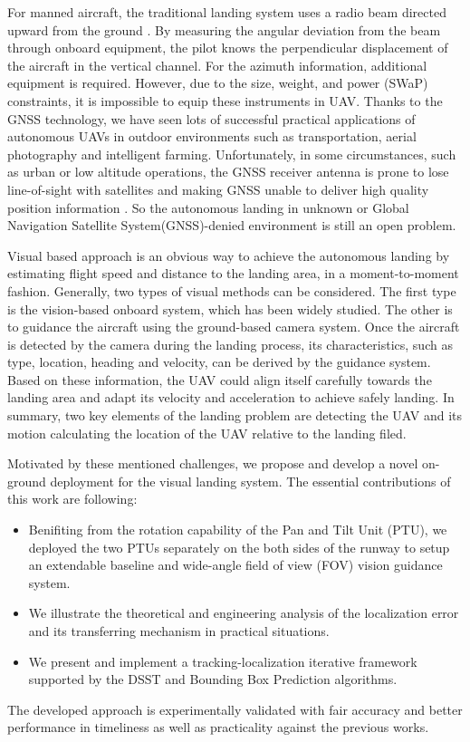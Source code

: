 \documentclass[journal,article,submit,moreauthors,pdftex,10pt,a4paper]{mdpi}
\begin{document}
For manned aircraft, the traditional landing system uses a radio beam directed upward from the ground \cite{mclean1990automatic, stevens2003aircraft}. By measuring the angular deviation from the beam through onboard equipment, the pilot knows the perpendicular displacement of the aircraft in the vertical channel. For the azimuth information, additional equipment is required. However, due to the size, weight, and power (SWaP) constraints, it is impossible to equip these instruments in UAV. Thanks to the GNSS technology, we have seen lots of successful practical applications of autonomous UAVs in outdoor environments such as transportation, aerial photography and intelligent farming. Unfortunately, in some circumstances, such as urban or low altitude operations, the GNSS receiver antenna is prone to lose line-of-sight with satellites and making GNSS unable to deliver high quality position information \cite{farrell1998gps}. So the autonomous landing in unknown or Global Navigation Satellite System(GNSS)-denied environment is still an open problem. 

Visual based approach is an obvious way to achieve the autonomous landing by estimating flight speed and distance to the landing area, in a moment-to-moment fashion. Generally, two types of visual methods can be considered. The first type is the vision-based onboard system, which has been widely studied. The other is to guidance the aircraft using the ground-based camera system. Once the aircraft is detected by the camera during the landing process, its characteristics, such as type, location, heading and velocity, can be derived by the guidance system. Based on these information, the UAV could align itself carefully towards the landing area and adapt its velocity and acceleration to achieve safely landing. In summary, two key elements of the landing problem are detecting the UAV and its motion calculating the location of the UAV relative to the landing filed. 

Motivated by these mentioned challenges, we propose and develop a novel on-ground deployment for the visual landing system. The essential contributions of this work are following:
\begin{itemize}
	\item Benifiting from the rotation capability of the Pan and Tilt Unit (PTU), we deployed the two PTUs separately on the both sides of the runway to setup an extendable baseline and wide-angle field of view (FOV) vision guidance system.
	\item We illustrate the theoretical and engineering analysis of the localization error and its transferring mechanism in practical situations.
	\item We present and implement a tracking-localization iterative framework supported by the DSST and Bounding Box Prediction algorithms.
\end{itemize}
The developed approach is experimentally validated with fair accuracy and better performance in timeliness as well as practicality against the previous works.
\end{document}
